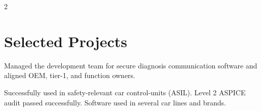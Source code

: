\begin{paracol}{2}




\section{Selected Projects}

\begin{tightemize}
\item Managed the development team for secure diagnosis communication software and aligned OEM, tier-1, and function owners.
\item Successfully used in safety-relevant car control-units (ASIL). Level 2 ASPICE audit passed successfully. Software used in several car lines and brands.
\end{tightemize}
\sectionsep


\end{paracol}

